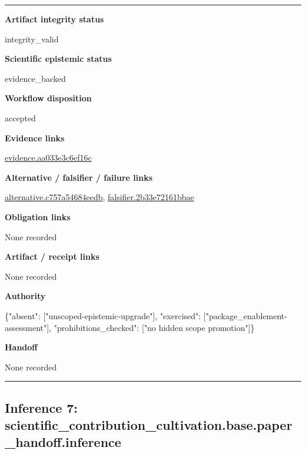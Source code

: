 \documentclass[10pt,a4paper]{article}
\newcommand{\TraceField}[2]{\par\noindent\textbf{#1}\par\noindent #2\par\smallskip}
\newenvironment{TraceDossier}{\par\medskip\noindent\hrule\medskip}{\medskip\hrule\par\medskip}
\begin{document}
\begin{TraceDossier}
\TraceField{Artifact integrity status}{integrity\_\allowbreak{}valid}

\TraceField{Scientific epistemic status}{evidence\_\allowbreak{}backed}

\TraceField{Workflow disposition}{accepted}

\TraceField{Evidence links}{\hyperlink{trace-evidence-90b9808d221a4f4ac1}{evidence.\allowbreak{}aa033e3c6e\allowbreak{}f16c}}

\TraceField{Alternative / falsifier / failure links}{\hyperlink{trace-alternative-562ad8bc1e55bbdfde}{alternativ\allowbreak{}e.\allowbreak{}c757a54684\allowbreak{}eedb}, \hyperlink{trace-alternative-cbbd92a4330089f0ea}{falsifier.\allowbreak{}2b33e72161\allowbreak{}bbae}}

\TraceField{Obligation links}{None recorded}

\TraceField{Artifact / receipt links}{None recorded}

\TraceField{Authority}{\{"absent":\allowbreak{} ["unscoped\allowbreak{}-\allowbreak{}epistemic-\allowbreak{}upgrade"],\allowbreak{} "exercised\allowbreak{}":\allowbreak{} ["package\_\allowbreak{}enablement\allowbreak{}-\allowbreak{}assessment\allowbreak{}"], "prohibiti\allowbreak{}ons\_\allowbreak{}checked":\allowbreak{} ["no hidden scope promotion"\allowbreak{}]\}}

\TraceField{Handoff}{None recorded}

\end{TraceDossier}
\pagebreak[2]\subsection{Inference 7: scientific\allowbreak{}\_\allowbreak{}contributi\allowbreak{}on\_\allowbreak{}cultivatio\allowbreak{}n.\allowbreak{}base.\allowbreak{}paper\_\allowbreak{}handoff.\allowbreak{}inference}\label{trace-inference-56366952f03810e7d4}
\end{document}
